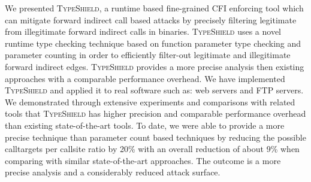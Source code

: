 We presented \textsc{TypeShield}, a runtime based fine-grained CFI enforcing
tool which can mitigate forward indirect call based attacks by
precisely filtering legitimate from illegitimate forward indirect calls in binaries.
\textsc{TypeShield} uses a novel runtime type checking technique based on function parameter
type checking and parameter counting in order to efficiently filter-out legitimate
and illegitimate forward indirect edges.
\textsc{TypeShield} provides a more precise analysis then existing approaches with a
comparable performance overhead.
We have implemented \textsc{TypeShield} and applied it to real software such as:
web servers and FTP servers.
We demonstrated through extensive experiments and comparisons with related tools
that \textsc{TypeShield} has higher precision and comparable performance overhead than 
existing state-of-the-art tools. To date, we were able to provide a more precise
technique than parameter count based techniques by reducing the possible calltargets 
per callsite ratio by 20\% with an overall reduction of about 
9\% when comparing with similar state-of-the-art approaches.
The outcome is a more precise analysis and a considerably reduced attack surface.


